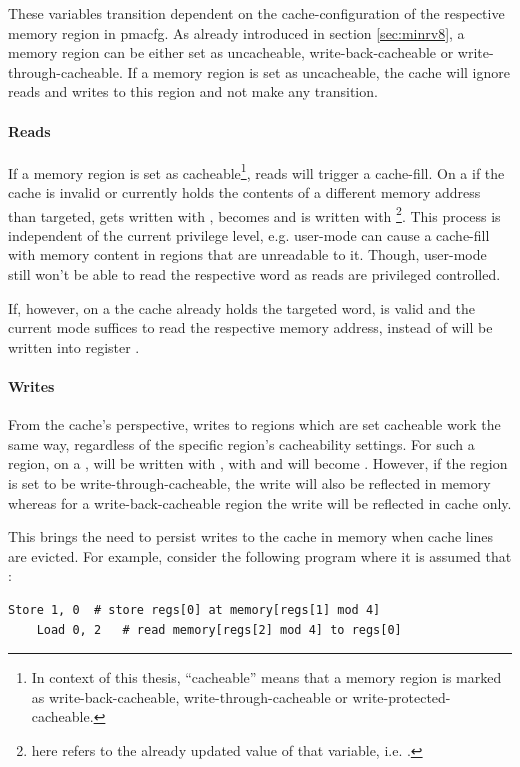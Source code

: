 These variables transition dependent on the cache-configuration of the respective memory region in \gls{pmacfg}.
As already introduced in section \ref{sec:minrv8}, a memory region can be either set as uncacheable, write-back-cacheable or write-through-cacheable.
If a memory region is set as uncacheable, the cache will ignore reads and writes to this region and not make any transition.

\paragraph{Reads}
If a memory region is set as cacheable\footnote{%
    In context of this thesis, \enquote{cacheable} means that a memory region is marked as write-back-cacheable, write-through-cacheable or write-protected-cacheable.
}, reads will trigger a cache-fill.
On a  if the cache is invalid or currently holds the contents of a different memory address than targeted,  gets written with ,  becomes  and  is written with \footnote{%
     here refers to the already updated value of that variable, i.e. .
}.
This process is independent of the current privilege level, e.g. user-mode can cause a cache-fill with memory content in regions that are unreadable to it.
Though, user-mode still won't be able to read the respective word as reads are privileged controlled.

If, however, on a  the cache already holds the targeted word, is valid and the current mode suffices to read the respective memory address,  instead of  will be written into register .

\paragraph{Writes}
From the cache's perspective, writes to regions which are set cacheable work the same way, regardless of the specific region's cacheability settings.
For such a region, on a ,  will be written with ,  with  and  will become .
However, if the region is set to be write-through-cacheable, the write will also be reflected in memory whereas for a write-back-cacheable region the write will be reflected in cache only.

This brings the need to persist writes to the cache in memory when cache lines are evicted.
For example, consider the following program where it is assumed that :
\begin{lstlisting}[language=minrv8]
    Store 1, 0  # store regs[0] at memory[regs[1] mod 4]
    Load 0, 2   # read memory[regs[2] mod 4] to regs[0]
\end{lstlisting}

